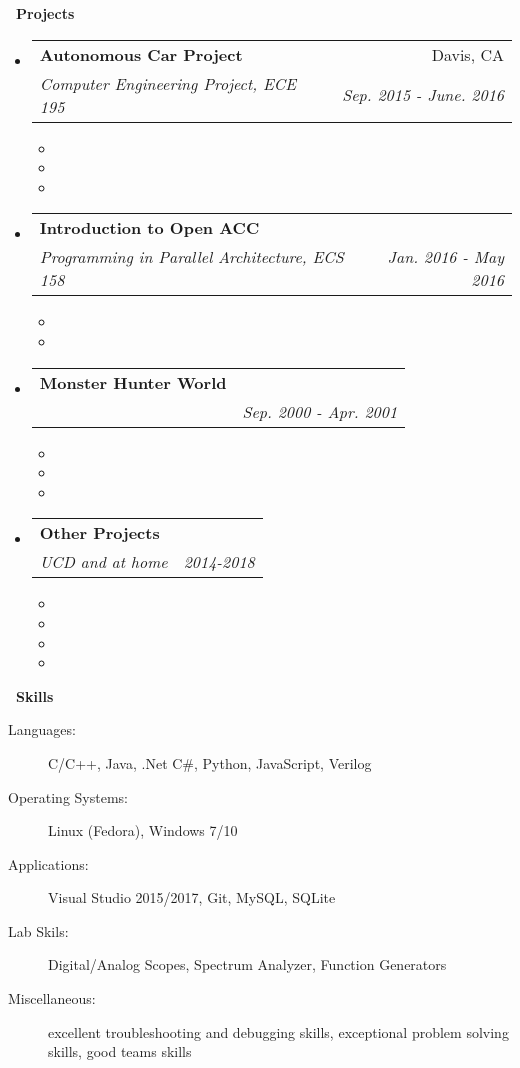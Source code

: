 \documentclass[letterpaper,11pt]{article}
\makeatletter
\newcommand{\resitem}[1]{\item #1 \vspace{-2pt}}
\newcommand{\resheading}[1]{
  \parbox{\textwidth}{
    \begin{shaded}
      \textbf{\mbox{~}{\large #1} \vphantom{p\^{E}}}
    \end{shaded}
  }
}
\newcommand{\ressubheading}[4]{
\begin{tabular*}{6.5in}{l@{\extracolsep{\fill}}r}
		\textbf{#1} & #2 \\
		\textit{#3} & \textit{#4} \\
\end{tabular*}\vspace{-6pt}}
\makeatother
\begin{document}
\resheading{Projects}
\begin{itemize}
\item
	\ressubheading{Autonomous Car Project}{Davis, CA}{Computer Engineering Project, ECE 195}{Sep. 2015 - June. 2016}
	\begin{itemize}
		\resitem{}
		\resitem{}
		\resitem{}
	\end{itemize}

\item
	\ressubheading{Introduction to Open ACC}{}{Programming in Parallel Architecture, ECS 158}{Jan. 2016 - May 2016}
	\begin{itemize}
		\resitem{}
		\resitem{}
	\end{itemize}

\item
	\ressubheading{Monster Hunter World }{}{}{Sep. 2000 - Apr. 2001}
	\begin{itemize}
		\resitem{}
		\resitem{}
		\resitem{}
	\end{itemize}

\item
	\ressubheading{Other Projects}{}{UCD and at home}{2014-2018}
	\begin{itemize}
		\resitem{}
		\resitem{}
		\resitem{}
		\resitem{}
	\end{itemize}

\end{itemize}

\resheading{Skills}

\begin{description}
\item[Languages:]
C/C++, Java, .Net C\#, Python, JavaScript, Verilog
\item[Operating Systems:]
Linux (Fedora), Windows 7/10
\item[Applications:]
Visual Studio 2015/2017, Git, MySQL, SQLite
\item[Lab Skils:]
Digital/Analog Scopes, Spectrum Analyzer, Function Generators
\item[Miscellaneous:]
excellent troubleshooting and debugging skills, exceptional problem solving skills, good teams skills
\end{description}
\end{document}
